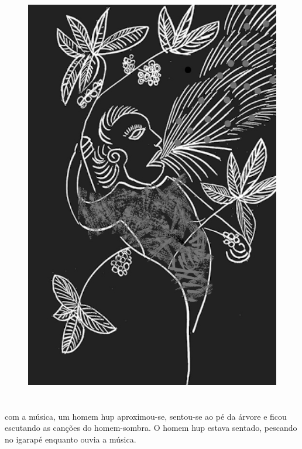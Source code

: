 \begin{figure}
\vspace*{-2cm}
\hspace*{-2.4cm}\includegraphics[width=142mm]{./imgs/img1.jpg}
\end{figure}

\chapter*{}

\mbox{}\vspace*{\fill}

 com a música,
um homem hup aproximou-se,
sentou-se ao pé da
árvore e ficou escutando as
canções do homem-sombra. O
homem hup estava sentado,
pescando no igarapé
enquanto ouvia a música.

